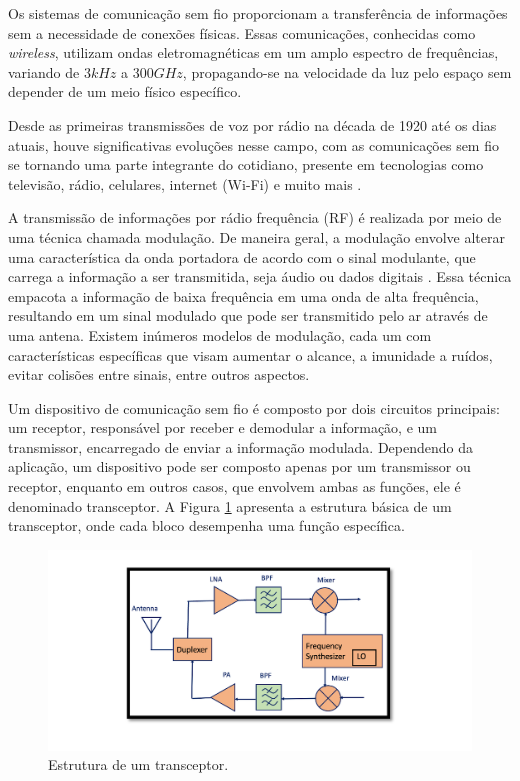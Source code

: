 Os sistemas de comunicação sem fio proporcionam a transferência de informações sem a necessidade de conexões físicas. Essas comunicações, conhecidas como \textit{wireless}, utilizam ondas eletromagnéticas em um amplo espectro de frequências, variando de $3kHz$ a $300GHz$, propagando-se na velocidade da luz pelo espaço sem depender de um meio físico específico.

Desde as primeiras transmissões de voz por rádio na década de 1920 até os dias atuais, houve significativas evoluções nesse campo, com as comunicações sem fio se tornando uma parte integrante do cotidiano, presente em tecnologias como televisão, rádio, celulares, internet (Wi-Fi) e muito mais \cite{dowla2003handbook}.

A transmissão de informações por rádio frequência (RF) é realizada por meio de uma técnica chamada modulação. De maneira geral, a modulação envolve alterar uma característica da onda portadora de acordo com o sinal modulante, que carrega a informação a ser transmitida, seja áudio ou dados digitais \cite{engtadeu2011}. Essa técnica empacota a informação de baixa frequência em uma onda de alta frequência, resultando em um sinal modulado que pode ser transmitido pelo ar através de uma antena. Existem inúmeros modelos de modulação, cada um com características específicas que visam aumentar o alcance, a imunidade a ruídos, evitar colisões entre sinais, entre outros aspectos.

Um dispositivo de comunicação sem fio é composto por dois circuitos principais: um receptor, responsável por receber e demodular a informação, e um transmissor, encarregado de enviar a informação modulada. Dependendo da aplicação, um dispositivo pode ser composto apenas por um transmissor ou receptor, enquanto em outros casos, que envolvem ambas as funções, ele é denominado transceptor. A Figura \ref{fig:tranceiver_structure} apresenta a estrutura básica de um transceptor, onde cada bloco desempenha uma função específica.
\begin{figure}[h!]
	\caption{Estrutura de um transceptor.}
	\begin{center}
		\includegraphics[scale=0.6]{img/tranceiver_structure.png}
	\end{center}
	\label{fig:tranceiver_structure}
\end{figure}


